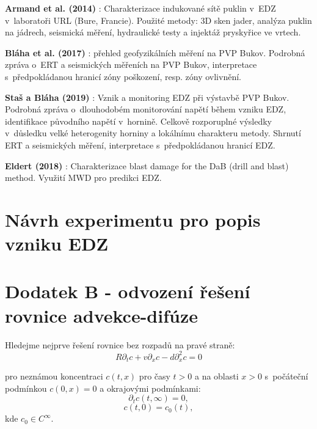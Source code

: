 \documentclass{article}
\def\prtl{\partial}
\begin{document}
{\bf Armand et al. (2014)} \cite{Armand2014}: Charakterizace indukované sítě puklin v~EDZ v~laboratoři URL (Bure, Francie). Použité metody: 3D sken jader, analýza puklin na jádrech, seismická měření, hydraulické testy a injektáž pryskyřice ve vrtech. 

{\bf Bláha et al. (2017)} \cite{SURAO_184/2014}: přehled geofyzikálních měření na PVP Bukov.
Podrobná zpráva o~ERT a seismických měřeních na PVP Bukov, interpretace s~předpokládanou hranicí zóny poškození, resp. zóny ovlivnění.  

{\bf Staš a Bláha (2019)} \cite{SURAO_351/2019}: Vznik a monitoring EDZ při výstavbě PVP Bukov.
Podrobná zpráva o~dlouhodobém monitorování napětí během vzniku EDZ, identifikace původního napětí v~hornině. Celkově rozporuplné výsledky v~důsledku velké heterogenity horniny a lokálnímu charakteru metody. Shrnutí ERT a seismických měření, interpretace s~předpokládanou hranicí EDZ.  

{\bf Eldert (2018)} \cite{JeroenvanEldert2018}: Charakterizace blast damage for the DaB (drill and blast) method. Využití MWD pro predikci EDZ.

\section{Návrh experimentu pro popis vzniku EDZ}

\label{sec:experiment}



\pagebreak






\section*{Dodatek B - odvození řešení rovnice advekce-difúze}
Hledejme nejprve řešení rovnice bez rozpadů na pravé straně:
\begin{equation}
    \label{eq:no_decay_ad}
    R\prtl_t c + v \prtl_x c - d \prtl^2_x c = 0
\end{equation}

pro neznámou koncentraci $c(t, x)$ pro časy $t>0$ a na oblasti $x>0$ s~počáteční podmínkou $c(0, x) = 0$ a
okrajovými podmínkami:
\[
    \prtl_t c(t, \infty) = 0,
\]
\[
    c(t, 0) = c_0(t),
\]
kde $c_0 \in C^\infty$.
\end{document}
